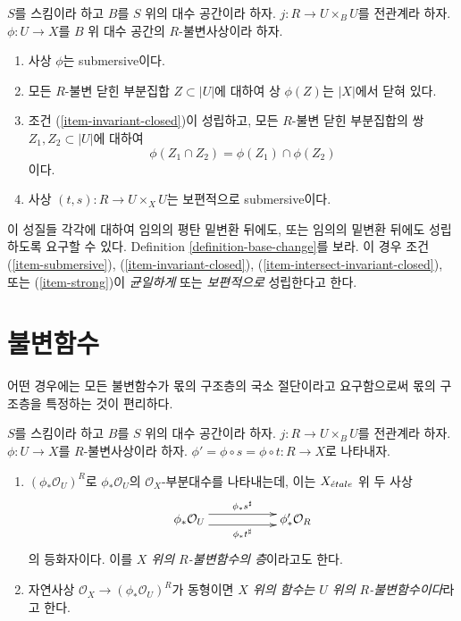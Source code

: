 \begin{definition}
\label{definition-topological}
$S$를 스킴이라 하고 $B$를 $S$ 위의 대수 공간이라 하자.
$j : R \to U \times_B U$를 전관계라 하자.
$\phi : U \to X$를 $B$ 위 대수 공간의 $R$-불변사상이라 하자.
\begin{enumerate}
\item
\label{item-submersive}
사상 $\phi$는 submersive이다.
\item
\label{item-invariant-closed}
모든 $R$-불변 닫힌 부분집합 $Z \subset |U|$에 대하여
상 $\phi(Z)$는 $|X|$에서 닫혀 있다.
\item
\label{item-intersect-invariant-closed}
조건 (\ref{item-invariant-closed})이 성립하고, 모든
$R$-불변 닫힌 부분집합의 쌍 $Z_1, Z_2 \subset |U|$에 대하여
$$
\phi(Z_1 \cap Z_2) = \phi(Z_1) \cap \phi(Z_2)
$$
이다.
\item 사상 $(t, s) : R \to U \times_X U$는 보편적으로 submersive이다.
\label{item-strong}
\end{enumerate}
이 성질들 각각에 대하여 임의의 평탄 밑변환 뒤에도, 또는 임의의
밑변환 뒤에도 성립하도록 요구할 수 있다. Definition
\ref{definition-base-change}를 보라. 이 경우 조건
(\ref{item-submersive}),
(\ref{item-invariant-closed}),
(\ref{item-intersect-invariant-closed}), 또는
(\ref{item-strong})이 {\it 균일하게} 또는 {\it 보편적으로} 성립한다고 한다.
\end{definition}








\section{불변함수}
\label{section-functions}

\noindent
어떤 경우에는 모든 불변함수가 몫의 구조층의 국소 절단이라고
요구함으로써 몫의 구조층을 특정하는 것이 편리하다.

\begin{definition}
\label{definition-functions}
$S$를 스킴이라 하고 $B$를 $S$ 위의 대수 공간이라 하자.
$j : R \to U \times_B U$를 전관계라 하자.
$\phi : U \to X$를 $R$-불변사상이라 하자.
$\phi' = \phi \circ s = \phi \circ t : R \to X$로 나타내자.
\begin{enumerate}
\item $(\phi_*\mathcal{O}_U)^R$로 $\phi_*\mathcal{O}_U$의
$\mathcal{O}_X$-부분대수를 나타내는데, 이는 $X_{\acute{e}tale}$ 위 두 사상
$$
\xymatrix{
\phi_*\mathcal{O}_U
\ar@<1ex>[rr]^{\phi_*s^\sharp}
\ar@<-1ex>[rr]_{\phi_*t^\sharp}
& &
\phi'_*\mathcal{O}_R
}
$$
의 등화자이다. 이를 {\it $X$ 위의 $R$-불변함수의 층}이라고도 한다.
\item 자연사상 $\mathcal{O}_X \to (\phi_*\mathcal{O}_U)^R$가
동형이면 {\it $X$ 위의 함수는 $U$ 위의 $R$-불변함수이다}라고 한다.
\end{enumerate}
\end{definition}

